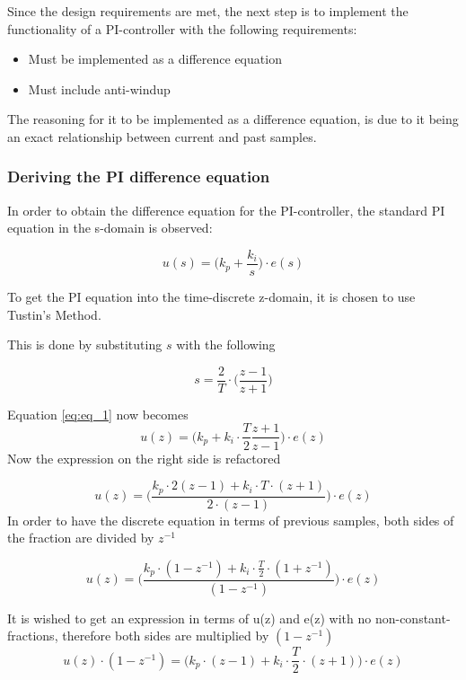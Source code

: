 \documentclass[../../../main]{subfiles}
\begin{document}
Since the design requirements are met, the next step is to implement the functionality of a PI-controller with the following requirements:
\begin{itemize}
    \item Must be implemented as a difference equation
    \item Must include anti-windup
\end{itemize}
The reasoning for it to be implemented as a difference equation, is due to it being an exact relationship between current and past samples.

\subsubsection{Deriving the PI difference equation}

In order to obtain the difference equation for the PI-controller, the standard PI equation in the s-domain is observed:

\begin{equation}
  u(s) = \Bigg(k_p + \frac{k_i}{s} \Bigg) \cdot e(s) \label{eq:eq_1}
\end{equation}


To get the PI equation into the time-discrete z-domain, it is chosen to use Tustin's Method.

This is done by substituting $s$ with the following

$$
s = \frac{2}{T}\cdot \Bigg( \frac{z-1}{z+1}\Bigg)
$$

Equation \eqref{eq:eq_1} now becomes
$$
  u(z) = \Bigg(k_p + k_i\cdot \frac{T}{2} \frac{z+1}{z-1} \Bigg) \cdot e(z)
$$
Now the expression on the right side is refactored

$$
  u(z) = \Bigg( \frac{k_p \cdot 2(z-1) + k_i \cdot T \cdot (z+1)}{2\cdot (z-1)}\Bigg) \cdot e(z)
$$
In order to have the discrete equation in terms of previous samples, both sides of the fraction are divided by $z^{-1}$

$$
  u(z) = \Bigg( \frac{k_p \cdot(1-z^{-1}) + k_i \cdot \frac{T}{2} \cdot (1+z^{-1}) }{(1-z^{-1})}\Bigg) \cdot e(z)
$$

It is wished to get an expression in terms of u(z) and e(z) with no non-constant-fractions, therefore both sides are multiplied by $(1 - z^{-1})$
$$
  u(z)\cdot(1 - z^{-1}) = \Bigg( k_p \cdot(z-1) + k_i \cdot \frac{T}{2} \cdot (z+1) \Bigg) \cdot e(z)
$$
\end{document}
